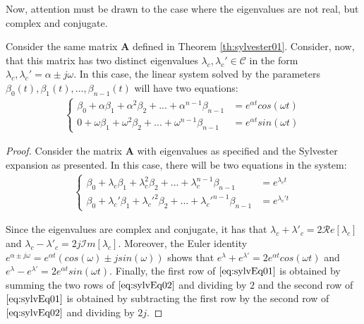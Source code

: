 \documentclass[a4paper,11pt]{book}
\numberwithin{figure}{chapter}
\numberwithin{equation}{chapter}
\numberwithin{table}{chapter}
\newtheorem{theorem}{Theorem}[chapter]
\theoremstyle{definition}
\newcounter{boxed-theorem}
\newenvironment{boxed-theorem}[1]
{\begin{shaded} \begin{theorem}{#1}}
{\end{theorem} \end{shaded}}
\begin{document}
Now, attention must be drawn to the case where the eigenvalues are not real, but complex and conjugate. 

\begin{boxed-theorem}{} \label{th:sylvester02}
    Consider the same matrix $\bm{A}$ defined in Theorem \ref{th:sylvester01}. Consider, now, that this matrix has two distinct eigenvalues $\lambda_c, \lambda_c' \in \mathcal{C}$ in the form $\lambda_c, \lambda_c' = \alpha \pm j \omega$. In this case, the linear system solved by the parameters $\beta_0(t), \beta_1(t), ..., \beta_{n-1}(t)$ will have two equations:
    \begin{align} \label{eq:sylvEq02}
    \begin{cases}
        \beta_0 + \alpha \beta_1 + \alpha^{2} \beta_2 + ... + \alpha^{n-1} \beta_{n-1} &= e^{\alpha t} cos(\omega t) \\
        0 + \omega \beta_1 + \omega^{2} \beta_2 + ... + \omega^{n-1} \beta_{n-1} &= e^{\alpha t} sin(\omega t)
    \end{cases}
    \end{align}
\end{boxed-theorem}

\begin{proof}
    Consider the matrix $\bm{A}$ with eigenvalues as specified and the Sylvester expansion as presented. In this case, there will be two equations in the system:
    \begin{align} \label{eq:sylvEq01}
    \begin{cases}
        \beta_0 + \lambda_c \beta_1 + \lambda_c^2  \beta_2 + ... + \lambda_c^{n-1} \beta_{n-1} &= e^{\lambda_c t} \\
        \beta_0 + \lambda_c' \beta_1 + \lambda_c'^{2} \beta_2 + ... + \lambda_c'^{n-1} \beta_{n-1} &= e^{\lambda_c' t}
    \end{cases}
    \end{align}
    
    Since the eigenvalues are complex and conjugate, it has that $\lambda_c + \lambda'_c = 2 \mathcal{R}e[\lambda_c]$ and $\lambda_c - \lambda'_c = 2j \mathcal{I}m[\lambda_c]$. Moreover, the Euler identity $e^{\alpha \pm j \omega} = e^{\alpha t}(cos(\omega) \pm j sin(\omega))$ shows that $e^{\lambda} + e^{\lambda'} = 2 e^{\alpha t} cos(\omega t)$ and $e^{\lambda} - e^{\lambda'} = 2 e^{\alpha t} sin(\omega t)$. Finally, the first row of $\ref{eq:sylvEq01}$ is obtained by summing the two rows of $\eqref{eq:sylvEq02}$ and dividing by $2$ and the second row of $\eqref{eq:sylvEq01}$ is obtained by subtracting the first row by the second row of $\eqref{eq:sylvEq02}$ and dividing by $2j$. 
\end{proof}
\end{document}
